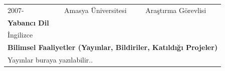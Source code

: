 \documentclass[
oneside, %
doktora, %
]{aufbetez} %
\begin{document}
\begin{ozgecmis}
\begin{table}[htbp]
\begin{tabular}{lll}
			2007-                   & Amasya Üniversitesi     & Araştırma Görevlisi             \\
			\textbf{Yabancı Dil}             &                         &                                 \\
			İngilizce               &                         &                                 \\
			\multicolumn{3}{l}{\textbf{Bilimsel Faaliyetler (Yayınlar, Bildiriler, Katıldığı Projeler)}} \\
			\multicolumn{3}{l}{
				Yayınlar buraya yazılabilir..
			}
		\end{tabular}%
	\end{table}
\end{ozgecmis}

\end{document}
